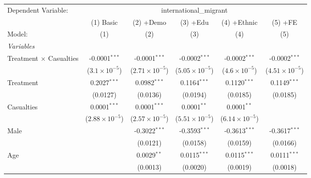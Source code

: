 
\begingroup
\centering
\begin{tabular}{lccccc}
   \tabularnewline \midrule \midrule
   Dependent Variable: & \multicolumn{5}{c}{international\_migrant}\\
                                  & (1) Basic               & (2) +Demo                      & (3) +Edu                & (4) +Ethnic             & (5) +FE \\   
   Model:                         & (1)                     & (2)                            & (3)                     & (4)                     & (5)\\  
   \midrule
   \emph{Variables}\\
   Treatment $\times$ Casualties  & -0.0001$^{***}$         & -0.0001$^{***}$                & -0.0002$^{***}$         & -0.0002$^{***}$         & -0.0002$^{***}$\\   
                                  & ($3.1\times 10^{-5}$)   & ($2.71\times 10^{-5}$)         & ($5.05\times 10^{-5}$)  & ($4.6\times 10^{-5}$)   & ($4.51\times 10^{-5}$)\\    
   Treatment                      & 0.2027$^{***}$          & 0.0982$^{***}$                 & 0.1164$^{***}$          & 0.1120$^{***}$          & 0.1149$^{***}$\\   
                                  & (0.0127)                & (0.0136)                       & (0.0194)                & (0.0185)                & (0.0185)\\   
   Casualties                     & 0.0001$^{***}$          & 0.0001$^{***}$                 & 0.0001$^{**}$           & 0.0001$^{**}$           &   \\   
                                  & ($2.88\times 10^{-5}$)  & ($2.57\times 10^{-5}$)         & ($5.51\times 10^{-5}$)  & ($6.14\times 10^{-5}$)  &   \\   
   Male                           &                         & -0.3022$^{***}$                & -0.3593$^{***}$         & -0.3613$^{***}$         & -0.3617$^{***}$\\   
                                  &                         & (0.0121)                       & (0.0158)                & (0.0159)                & (0.0166)\\   
   Age                            &                         & 0.0029$^{**}$                  & 0.0115$^{***}$          & 0.0115$^{***}$          & 0.0111$^{***}$\\   
                                  &                         & (0.0013)                       & (0.0020)                & (0.0019)                & (0.0018)\\   

\end{tabular}
